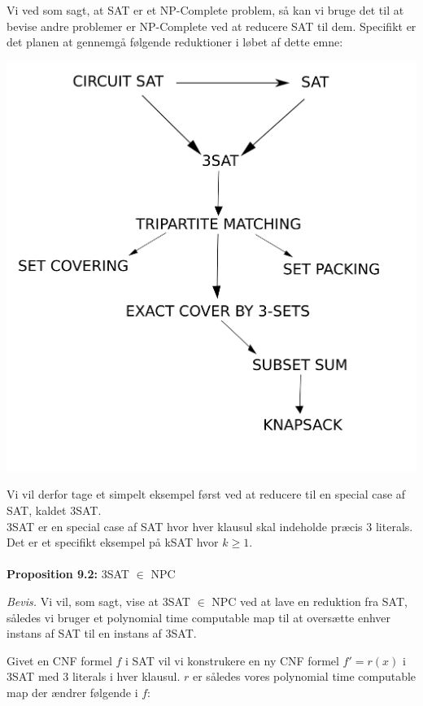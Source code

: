 Vi ved som sagt, at SAT er et NP-Complete problem, så kan vi bruge det til at bevise andre problemer er NP-Complete ved at reducere SAT til dem.
Specifikt er det planen at gennemgå følgende reduktioner i løbet af dette emne:
\begin{center}
 \includegraphics[bb=0 0 400 400,scale=0.5]{img/GraphReductionTreeSetNumbers.png}
\end{center}

Vi vil derfor tage et simpelt eksempel først ved at reducere til en special case af SAT, kaldet 3SAT.\\
3SAT er en special case af SAT hvor hver klausul skal indeholde præcis 3 literals. Det er et specifikt eksempel på kSAT hvor $k \geq 1$.\\
~\\
\textbf{Proposition 9.2:} 3SAT $\in$ NPC

\emph{Bevis.} Vi vil, som sagt, vise at 3SAT $\in$ NPC ved at lave en reduktion fra SAT, således vi bruger et polynomial time computable map til at oversætte enhver instans af SAT til en instans af 3SAT. 

Givet en CNF formel $f$ i SAT vil vi konstrukere en ny CNF formel $f' = r(x)$ i 3SAT med 3 literals i hver klausul. $r$ er således vores polynomial time computable map der ændrer følgende i $f$:\\

